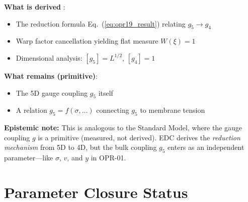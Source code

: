 \begin{tcolorbox}[colback=yellow!5!white, colframe=yellow!50!black,
    title=\textbf{OPR-19 Closure Status}]
\textbf{What is derived} \tagDc{}:
\begin{itemize}[nosep]
\item The reduction formula Eq.~(\ref{eq:opr19_result}) relating $g_5 \to g_4$
\item Warp factor cancellation yielding flat measure $W(\xi) = 1$
\item Dimensional analysis: $[g_5] = L^{1/2}$, $[g_4] = 1$
\end{itemize}

\textbf{What remains \tagP{} (primitive)}:
\begin{itemize}[nosep]
\item The 5D gauge coupling $g_5$ itself
\item A relation $g_5 = f(\sigma, \ldots)$ connecting $g_5$ to membrane tension
\end{itemize}

\textbf{Epistemic note:} This is analogous to the Standard Model, where the
gauge coupling $g$ is a primitive (measured, not derived). EDC derives the
\emph{reduction mechanism} from 5D to 4D, but the bulk coupling $g_5$ enters
as an independent parameter---like $\sigma$, $v$, and $y$ in OPR-01.
\end{tcolorbox}

\section{Parameter Closure Status}
\label{sec:param_status}

